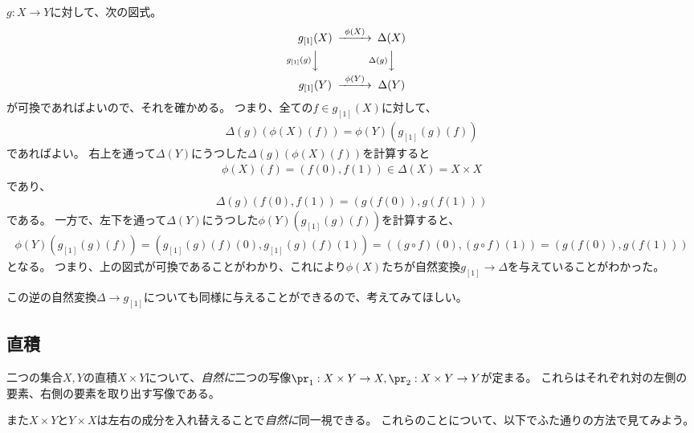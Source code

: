 \documentclass[uplatex]{jsarticle}
\begin{document}
$g:X \to Y$に対して、次の図式。
\[
\begin{CD}
g_{[1]}(X)@>\phi(X)>>\Delta(X)\\
@Vg_{[1]}(g)VV@V\Delta(g)VV\\
g_{[1]}(Y)@>\phi(Y)>>\Delta(Y)
\end{CD}
\]
が可換であればよいので、それを確かめる。
つまり、全ての$f \in g_{[1]}(X)$に対して、
\begin{align*}
\Delta(g)(\phi(X)(f))=\phi(Y)(g_{[1]}(g)(f))
\end{align*}であればよい。
右上を通って$\Delta(Y)$にうつした$\Delta(g)(\phi(X)(f))$を計算すると
\begin{align*}
\phi(X)(f)=(f(0), f(1))\in\Delta(X)=X\times X
\end{align*}
であり、
\begin{align*}
\Delta(g)(f(0),f(1))=(g(f(0)),g(f(1)))
\end{align*}
である。
一方で、左下を通って$\Delta(Y)$にうつした$\phi(Y)(g_{[1]}(g)(f))$を計算すると、
\begin{align*}
\phi(Y)(g_{[1]}(g)(f))= (g_{[1]}(g)(f)(0),g_{[1]}(g)(f)(1))=((g\circ f)(0), (g\circ f)(1))=(g(f(0)), g(f(1)))
\end{align*}
となる。
つまり、上の図式が可換であることがわかり、これにより$\phi(X)$たちが自然変換$g_{[1]} \to \Delta$を与えていることがわかった。

この逆の自然変換$\Delta \to g_{[1]}$についても同様に与えることができるので、考えてみてほしい。

\subsection{直積}
二つの集合$X, Y$の直積$X \times Y$について、\emph{自然に}二つの写像$\pr_1:X \times Y \to X, \pr_2:X \times Y \to Y$が定まる。
これらはそれぞれ対の左側の要素、右側の要素を取り出す写像である。

また$X \times Y$と$Y \times X$は左右の成分を入れ替えることで\emph{自然に}同一視できる。
これらのことについて、以下でふた通りの方法で見てみよう。

\vspace{10pt}
\end{document}
